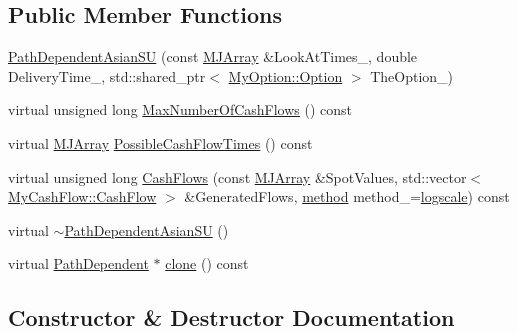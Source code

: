 \subsection*{Public Member Functions}
\begin{DoxyCompactItemize}
\item 
\hyperlink{classPathDependentAsianSU_a03a80a8e3d767d13dffb3b7b2faf6650}{Path\+Dependent\+Asian\+SU} (const \hyperlink{classMJArray}{M\+J\+Array} \&Look\+At\+Times\+\_\+, double Delivery\+Time\+\_\+, std\+::shared\+\_\+ptr$<$ \hyperlink{classMyOption_1_1Option}{My\+Option\+::\+Option} $>$ The\+Option\+\_\+)
\item 
virtual unsigned long \hyperlink{classPathDependentAsianSU_af02b751e82d9d1d153f17b67aeac1415}{Max\+Number\+Of\+Cash\+Flows} () const
\item 
virtual \hyperlink{classMJArray}{M\+J\+Array} \hyperlink{classPathDependentAsianSU_aa9f5c9b0e444fd4dbe50632c1410ae5a}{Possible\+Cash\+Flow\+Times} () const
\item 
virtual unsigned long \hyperlink{classPathDependentAsianSU_a335120548d42678cef0a43fb955b1636}{Cash\+Flows} (const \hyperlink{classMJArray}{M\+J\+Array} \&Spot\+Values, std\+::vector$<$ \hyperlink{classMyCashFlow_1_1CashFlow}{My\+Cash\+Flow\+::\+Cash\+Flow} $>$ \&Generated\+Flows, \hyperlink{PathDependent_8h_abed946c62f140eb7ff2ac742e6ad9497}{method} method\+\_\+=\hyperlink{PathDependent_8h_abed946c62f140eb7ff2ac742e6ad9497a064d3d3358889658ce07fe9f3191d1fd}{logscale}) const
\item 
virtual \hyperlink{classPathDependentAsianSU_a6405f36696ce70d00e92a9fc4d42b823}{$\sim$\+Path\+Dependent\+Asian\+SU} ()
\item 
virtual \hyperlink{classPathDependent}{Path\+Dependent} $\ast$ \hyperlink{classPathDependentAsianSU_ad564b11ca89eba61b306dccdf824a93a}{clone} () const
\end{DoxyCompactItemize}


\subsection{Constructor \& Destructor Documentation}
\hypertarget{classPathDependentAsianSU_a03a80a8e3d767d13dffb3b7b2faf6650}{}\label{classPathDependentAsianSU_a03a80a8e3d767d13dffb3b7b2faf6650} 
